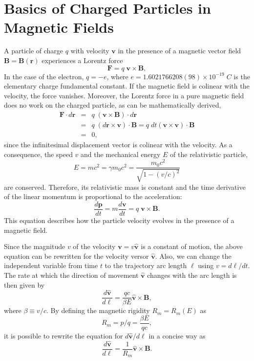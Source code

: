 \section{Basics of Charged Particles in Magnetic Fields} \label{sec:BasicsMagField}

A particle of charge $q$ with velocity $\bm{v}$ in the presence of a magnetic vector field $\bm{B} = \bm{B}(\bm{r})$ experiences a Lorentz force 
\begin{equation}
\bm{F} = q \; \bm{v} \times \bm{B},
\end{equation}
In the case of the electron, $q=-e$, where $e = 1.6021766208(98)\times10^{-19}\;C$ is the elementary charge fundamental constant. If the magnetic field is colinear with the velocity, the force vanishes. Moreover, the Lorentz force in a pure magnetic field does no work on the charged particle, as can be mathematically derived,
\begin{eqnarray}
\bm{F} \cdot d\bm{r} &=& q \; \left( \bm{v} \times \bm{B} \right) \cdot d\bm{r} \nonumber \\
                     &=& q \; \left( d\bm{r} \times \bm{v} \right) \cdot \bm{B} = q \; dt \left( \bm{v} \times \bm{v} \right) \cdot \bm{B} \\
                     &=& 0 \nonumber,
\end{eqnarray}
since the infinitesimal displacement vector is colinear with the velocity. As a consequence, the speed $v$ and the mechanical energy $E$ of the relativistic particle,
\begin{equation}
E = m c^2 = \gamma m_0 c^2 = \frac{m_0 c^2}{\sqrt{1-(v/c)^2}}
\end{equation}
are conserved. Therefore, its relativistic mass is constant and the time derivative of the linear momentum is proportional to the acceleration:
\begin{equation}
\frac{d\bm{p}}{dt} = m \frac{d\bm{v}}{dt} = q \; \bm{v} \times \bm{B}. 
\end{equation}
This equation describes how the particle velocity evolves in the presence of a magnetic field. 

Since the magnitude $v$ of the velocity $\bm{v} = v\bm{\hat{v}}$ is a constant of motion, the above equation can be rewritten for the velocity versor $\bm{\hat{v}}$. Also, we can change the independent variable from time $t$ to the trajectory arc length $\ell$ using $v = d\ell/dt$. The rate at which the direction of movement $\bm{\hat{v}}$ changes with the arc length is then given by
\begin{equation}
\frac{d\bm{\hat{v}}}{d\ell} = \frac{qc}{\beta E} \bm{\hat{v}} \times \bm{B},
\end{equation}
where $\beta \equiv v/c$. By defining the magnetic rigidity $R_m=R_m(E)$ as
\begin{equation}
R_m = p/q = \frac{\beta E}{qc},
\end{equation}
it is possible to rewrite the equation for $d\bm{\hat{v}}/d\ell$ in a concise way as
\begin{equation}
\label{eq:lorentz_versor}
\frac{d\bm{\hat{v}}}{d\ell} = \frac{1}{R_m} \bm{\hat{v}} \times \bm{B}.
\end{equation}

